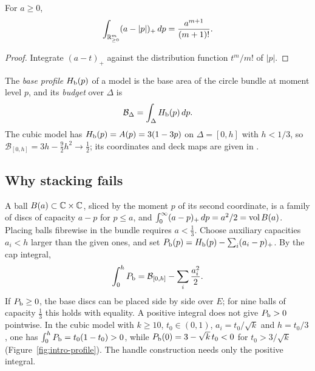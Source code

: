 \begin{lemma}\label{lem:mech-toric-volume}
For $a\ge0$,
\[
 \int_{\mathbb{R}^m_{\ge0}}(a-|p|)_+\,dp=\frac{a^{m+1}}{(m+1)!}.
\]
\end{lemma}

\begin{proof}
Integrate $(a-t)_+$ against the distribution function $t^m/m!$ of $|p|$.
\end{proof}

The \emph{base profile} $H_{\mathrm b}(p)$ of a model is the base area of the circle bundle at moment level $p$, and its
\emph{budget} over $\Delta$ is
\begin{equation}\label{eq:mech-model-volume}
 \mathcal B_\Delta=\int_\Delta H_{\mathrm b}(p)\,dp .
\end{equation}
The cubic model has $H_{\mathrm b}(p)=A(p)=3(1-3p)$ on $\Delta=[0,h]$ with $h<1/3$, so $\mathcal B_{[0,h]}=3h-\frac92h^2\to\frac12$;
its coordinates and deck maps are given in .

\subsection{Why stacking fails}\label{sec:mech-stacking}

A ball $B(a)\subset\mathbb{C}\times\mathbb{C}$, sliced by the moment $p$ of its second coordinate, is a family of discs of capacity
$a-p$ for $p\le a$, and $\int_0^\infty(a-p)_+\,dp=a^2/2=\operatorname{vol} B(a)$. Placing balls fibrewise in the bundle requires
$a<\frac13$. Choose auxiliary capacities $a_i<h$ larger than the given ones, and set $P_{\mathrm b}(p)=H_{\mathrm b}(p)-\sum_i(a_i-p)_+$. By the
cap integral,
\begin{equation}\label{eq:mech-mean}
 \int_0^hP_{\mathrm b}=\mathcal B_{[0,h]}-\sum_i\frac{a_i^2}{2}.
\end{equation}
If $P_{\mathrm b}\ge0$, the base discs can be placed side by side over $E$; for nine balls of capacity $\frac13$ this holds with
equality. A positive integral does not give $P_{\mathrm b}>0$ pointwise. In the cubic model with $k\ge10$, $t_0\in(0,1)$,
$a_i=t_0/\sqrt k$ and $h=t_0/3$, one has $\int_0^hP_{\mathrm b}=t_0(1-t_0)>0$, while $P_{\mathrm b}(0)=3-\sqrt k\,t_0<0$ for
$t_0>3/\sqrt k$ (Figure~\ref{fig:intro-profile}). The handle construction needs only the positive integral.

